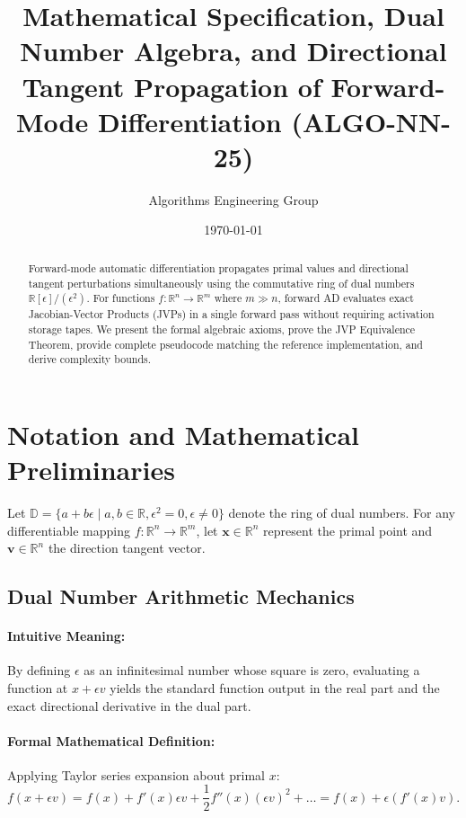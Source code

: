\documentclass[11pt]{article}
\title{\textbf{Mathematical Specification, Dual Number Algebra, and Directional Tangent Propagation of Forward-Mode Differentiation (ALGO-NN-25)}}
\author{Algorithms Engineering Group}
\date{\today}
\begin{document}
\maketitle

\begin{abstract}
Forward-mode automatic differentiation propagates primal values and directional tangent perturbations simultaneously using the commutative ring of dual numbers $\mathbb{R}[\epsilon]/(\epsilon^2)$. For functions $f: \mathbb{R}^n \to \mathbb{R}^m$ where $m \gg n$, forward AD evaluates exact Jacobian-Vector Products (JVPs) in a single forward pass without requiring activation storage tapes. We present the formal algebraic axioms, prove the JVP Equivalence Theorem, provide complete pseudocode matching the reference implementation, and derive complexity bounds.
\end{abstract}

\section{Notation and Mathematical Preliminaries}
\label{sec:notation}

Let $\mathbb{D} = \{a + b\epsilon \mid a, b \in \mathbb{R}, \epsilon^2 = 0, \epsilon \neq 0\}$ denote the ring of dual numbers. For any differentiable mapping $f: \mathbb{R}^n \to \mathbb{R}^m$, let $\mathbf{x} \in \mathbb{R}^n$ represent the primal point and $\mathbf{v} \in \mathbb{R}^n$ the direction tangent vector.

\subsection{Dual Number Arithmetic Mechanics}
\paragraph{Intuitive Meaning:} By defining $\epsilon$ as an infinitesimal number whose square is zero, evaluating a function at $x + \epsilon v$ yields the standard function output in the real part and the exact directional derivative in the dual part.

\paragraph{Formal Mathematical Definition:}
Applying Taylor series expansion about primal $x$:
\begin{equation}
\label{eq:dual_taylor}
f(x + \epsilon v) = f(x) + f'(x) \epsilon v + \frac{1}{2} f''(x) (\epsilon v)^2 + \dots = f(x) + \epsilon (f'(x) v).
\end{equation}
\end{document}
